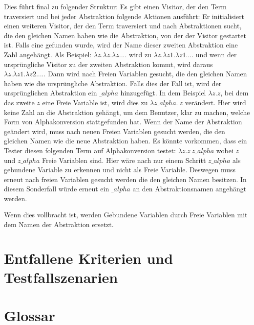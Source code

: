 \documentclass[parskip=full,11pt,twoside]{scrartcl}
\begin{document}
{	Dies führt final zu folgender Struktur:
	Es gibt einen Visitor, der den Term traversiert und bei jeder Abstraktion folgende Aktionen ausführt:
	Er initialisiert einen weiteren Visitor, der den Term traversiert und nach Abstraktionen sucht, die den gleichen Namen
	haben wie die Abstraktion, von der der Visitor gestartet ist. Falls eine gefunden wurde, wird der Name dieser zweiten
	Abstraktion eine Zahl angehängt. Als Beispiel: $\lambda z. \lambda z. \lambda z. ...$ wird zu $\lambda z. \lambda z1. \lambda z1. ...$ und wenn der ursprüngliche Visitor zu der zweiten Abstraktion kommt, wird daraus $\lambda z. \lambda z1. \lambda z2. ...$.
	Dann wird nach Freien Variablen gesucht, die den gleichen Namen haben wie die ursprüngliche Abstraktion. Falls dies
	der Fall ist, wird der ursprünglichen Abstraktion ein $\_ alpha$ hinzugefügt. In dem Beispiel $\lambda z. z$, bei dem
	das zweite $z$ eine Freie Variable ist, wird dies zu $\lambda z \_ alpha. \  z$ verändert.
	Hier wird keine Zahl an die Abstraktion gehängt, um dem Benutzer, klar zu machen, welche Form von Alphakonversion
	stattgefunden hat.
	Wenn der Name der Abstraktion geändert wird, muss  nach neuen Freien Variablen gesucht werden, die den
	gleichen Namen wie die neue Abstraktion haben. Es könnte vorkommen,
	dass ein Tester diesen folgenden Term auf Alphakonversion testet: $\lambda z. z \ z\_ alpha$ wobei $z$ und
	$z\_ alpha$ Freie Variablen sind.
	Hier wäre nach nur einem Schritt $z\_ alpha$ als gebundene Variable zu erkennen und nicht als Freie Variable.
	Deswegen muss erneut nach freien Variablen gesucht werden die den gleichen Namen besitzen.
	In diesem Sonderfall würde erneut ein $\_ alpha$ an den Abstraktionsnamen angehängt werden.
	
	Wenn dies vollbracht ist, werden Gebundene Variablen durch Freie Variablen mit dem Namen der Abstraktion ersetzt.
	
	
}


    \section{Entfallene Kriterien und Testfallszenarien}

    \section{Glossar}
\end{document}
